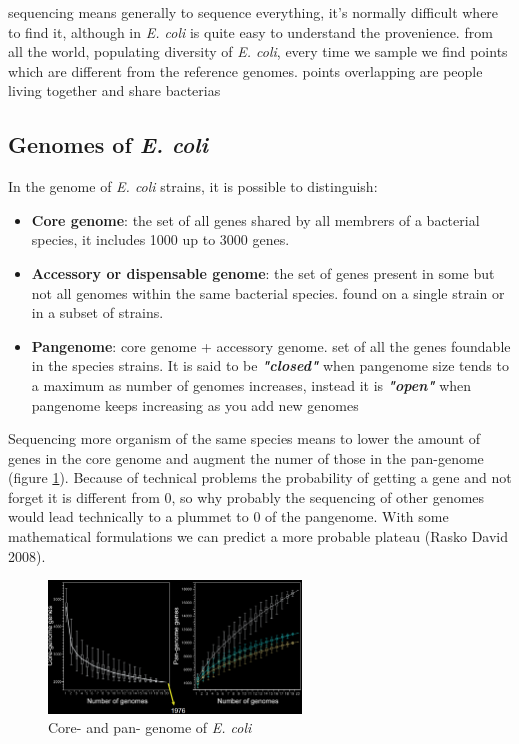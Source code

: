 sequencing means generally to sequence everything, it's normally difficult where to find it, although in \emph{\emph{E. coli}} is quite easy to understand the provenience.
from all the world, populating diversity of \emph{\emph{E. coli}}, every time we sample we find points which are different from the reference genomes.
points overlapping are people living together and share bacterias


\subsection{Genomes of \emph{E. coli}}

In the genome of \emph{E. coli} strains, it is possible to distinguish:

\begin{itemize}
    \item \textbf{Core genome}: the set of all genes shared by all membrers of a bacterial species, it includes 1000 up to 3000 genes.
    \item \textbf{Accessory or dispensable genome}: the set of genes present in some but not all genomes within the same bacterial species. found on a single strain or in a subset of strains. 
    \item \textbf{Pangenome}: core genome + accessory genome. set of all the genes foundable in the species strains. It is said to be \textit{\textbf{"closed"}} when pangenome size tends to a maximum as number of genomes increases, instead it is \textit{\textbf{"open"}} when pangenome keeps increasing as you add new genomes
\end{itemize}


Sequencing more organism of the same species means to lower the amount of genes in the core genome and augment the numer of those in the pan-genome (figure \ref{corepangenome}). 
Because of technical problems the probability of getting a gene and not forget it is different from 0, so why probably the sequencing of other genomes would lead technically to a plummet to 0 of the pangenome. With some mathematical formulations we can predict a more probable plateau (Rasko David 2008). 

\begin{figure}[h]
\caption{Core- and pan- genome of \emph{E. coli}}\label{corepangenome}
\centering
\includegraphics[width=0.6\textwidth]{EcoliCorePanGenome}
\end{figure}

